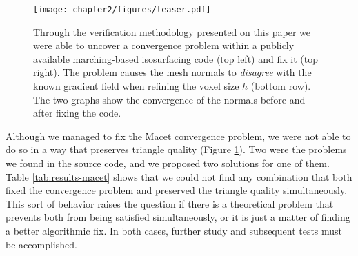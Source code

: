 \begin{figure}
\centering
\texttt{[image: chapter2/figures/teaser.pdf]}
\caption{Through the verification methodology presented on this paper 
we were able to uncover a convergence problem within a publicly available marching-based 
isosurfacing code (top left) and fix it (top right). The problem causes the mesh normals to 
\emph{disagree} with the known gradient field when refining the voxel size $h$ (bottom row). 
The two graphs show the convergence of the normals before and after fixing the code.}
\label{fig:teaser}
\end{figure}





Although we managed to fix the Macet convergence problem, we were not 
able to do so in a way that preserves triangle quality (Figure \ref{fig:teaser}).
Two were the problems we found in the source code, and we proposed two 
solutions for one of them. Table \ref{tab:results-macet} shows that we could 
not find any combination that both fixed the convergence problem and preserved the 
triangle quality simultaneously. This sort of behavior raises the question if there 
is a theoretical problem that prevents both from being satisfied simultaneously, 
or it is just a matter of finding a better algorithmic fix. 
In both cases, further study and subsequent tests must be accomplished.

